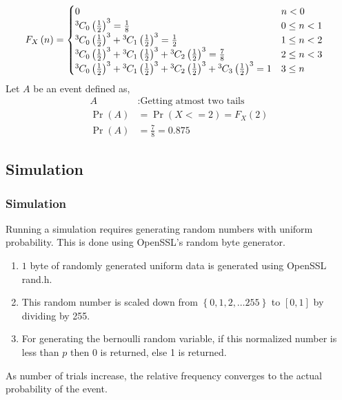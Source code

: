 \documentclass{beamer}
\providecommand{\pr}[1]{\ensuremath{\Pr\left(#1\right)}}
\providecommand{\sbrak}[1]{\ensuremath{{}\left[#1\right]}}
\providecommand{\brak}[1]{\ensuremath{\left(#1\right)}}
\providecommand{\cbrak}[1]{\ensuremath{\left\{#1\right\}}}
\theoremstyle{remark}
\newcommand*{\permcomb}[4][0mu]{{{}^{#3}\mkern#1#2_{#4}}}
\newcommand*{\comb}[1][-1mu]{\permcomb[#1]{C}}
\numberwithin{equation}{section}
\begin{document}
\begin{frame}
    \begin{align}
        F_{X}\brak{n} &= \begin{cases}
            0 & n < 0\\
            \comb{3}{0}\brak{\frac{1}{2}}^3 = \frac{1}{8} & 0 \leq n < 1\\
            \comb{3}{0}\brak{\frac{1}{2}}^3 + \comb{3}{1}\brak{\frac{1}{2}}^3 = \frac{1}{2} & 1 \leq n < 2\\
            \comb{3}{0}\brak{\frac{1}{2}}^3 + \comb{3}{1}\brak{\frac{1}{2}}^3 + \comb{3}{2}\brak{\frac{1}{2}}^3 = \frac{7}{8} & 2 \leq n < 3\\
            \comb{3}{0}\brak{\frac{1}{2}}^3 + \comb{3}{1}\brak{\frac{1}{2}}^3 + \comb{3}{2}\brak{\frac{1}{2}}^3 + \comb{3}{3}\brak{\frac{1}{2}}^3 = 1 & 3 \leq n
        \end{cases}
    \end{align}
Let $A$ be an event defined as,
\begin{align}
    A&\colon\text{Getting atmost two tails}\\
    \pr{A} &= \pr{X<=2} = F_{X}\brak{2}\\
    \pr{A} &= \frac{7}{8} = 0.875
\end{align}

\end{frame}

\subsection{Simulation}
\begin{frame}
\frametitle{Simulation}
Running a simulation requires generating random numbers with uniform probability. This is done using OpenSSL's random byte generator.
\begin{enumerate}
    \item $1$ byte of randomly generated uniform data is generated using OpenSSL rand.h.
    \item This random number is scaled down from $\cbrak{0, 1, 2, \dots 255}$ to $\sbrak{0, 1}$ by dividing by 255.
    \item For generating the bernoulli random variable, if this normalized number is less than $p$ then 0 is returned, else 1 is returned.
\end{enumerate}
As number of trials increase, the relative frequency converges to the actual probability of the event.
\end{frame}
\end{document}
